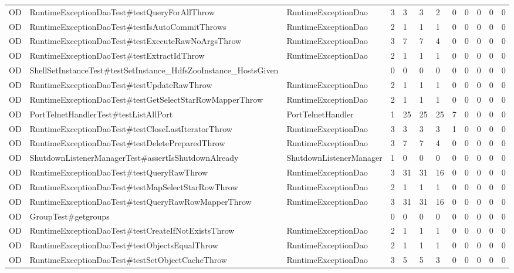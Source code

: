 \begin{table}[t]
\begin{tabular}{llllllllllll}
OD & RuntimeExceptionDaoTest\#testQueryForAllThrow & RuntimeExceptionDao & 3 & 3 & 3 & 2 & 0 & 0 & 0 & 0 & 0 \\
OD & RuntimeExceptionDaoTest\#testIsAutoCommitThrows & RuntimeExceptionDao & 2 & 1 & 1 & 1 & 0 & 0 & 0 & 0 & 0 \\
OD & RuntimeExceptionDaoTest\#testExecuteRawNoArgsThrow & RuntimeExceptionDao & 3 & 7 & 7 & 4 & 0 & 0 & 0 & 0 & 0 \\
OD & RuntimeExceptionDaoTest\#testExtractIdThrow & RuntimeExceptionDao & 2 & 1 & 1 & 1 & 0 & 0 & 0 & 0 & 0 \\
OD & ShellSetInstanceTest\#testSetInstance\_HdfsZooInstance\_HostsGiven &  & 0 & 0 & 0 & 0 & 0 & 0 & 0 & 0 & 0 \\
OD & RuntimeExceptionDaoTest\#testUpdateRawThrow & RuntimeExceptionDao & 2 & 1 & 1 & 1 & 0 & 0 & 0 & 0 & 0 \\
OD & RuntimeExceptionDaoTest\#testGetSelectStarRowMapperThrow & RuntimeExceptionDao & 2 & 1 & 1 & 1 & 0 & 0 & 0 & 0 & 0 \\
OD & PortTelnetHandlerTest\#testListAllPort & PortTelnetHandler & 1 & 25 & 25 & 25 & 7 & 0 & 0 & 0 & 0 \\
OD & RuntimeExceptionDaoTest\#testCloseLastIteratorThrow & RuntimeExceptionDao & 3 & 3 & 3 & 3 & 1 & 0 & 0 & 0 & 0 \\
OD & RuntimeExceptionDaoTest\#testDeletePreparedThrow & RuntimeExceptionDao & 3 & 7 & 7 & 4 & 0 & 0 & 0 & 0 & 0 \\
OD & ShutdownListenerManagerTest\#assertIsShutdownAlready & ShutdownListenerManager & 1 & 0 & 0 & 0 & 0 & 0 & 0 & 0 & 0 \\
OD & RuntimeExceptionDaoTest\#testQueryRawThrow & RuntimeExceptionDao & 3 & 31 & 31 & 16 & 0 & 0 & 0 & 0 & 0 \\
OD & RuntimeExceptionDaoTest\#testMapSelectStarRowThrow & RuntimeExceptionDao & 2 & 1 & 1 & 1 & 0 & 0 & 0 & 0 & 0 \\
OD & RuntimeExceptionDaoTest\#testQueryRawRowMapperThrow & RuntimeExceptionDao & 3 & 31 & 31 & 16 & 0 & 0 & 0 & 0 & 0 \\
OD & GroupTest\#getgroups &  & 0 & 0 & 0 & 0 & 0 & 0 & 0 & 0 & 0 \\
OD & RuntimeExceptionDaoTest\#testCreateIfNotExistsThrow & RuntimeExceptionDao & 2 & 1 & 1 & 1 & 0 & 0 & 0 & 0 & 0 \\
OD & RuntimeExceptionDaoTest\#testObjectsEqualThrow & RuntimeExceptionDao & 2 & 1 & 1 & 1 & 0 & 0 & 0 & 0 & 0 \\
OD & RuntimeExceptionDaoTest\#testSetObjectCacheThrow & RuntimeExceptionDao & 3 & 5 & 5 & 3 & 0 & 0 & 0 & 0 & 0 \\

\end{tabular}
\end{table}
